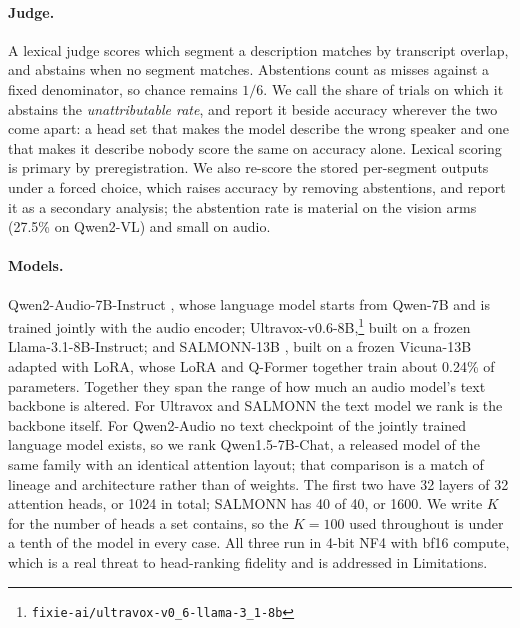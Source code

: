 \documentclass[11pt]{article}
\begin{document}
\paragraph{Judge.} A lexical judge scores which segment a description matches by
transcript overlap, and abstains when no segment matches. Abstentions count as
misses against a fixed denominator, so chance remains $1/6$. We call the share of
trials on which it abstains the \emph{unattributable rate}, and report it beside
accuracy wherever the two come apart: a head set that makes the model describe the
wrong speaker and one that makes it describe nobody score the same on accuracy
alone. Lexical scoring is
primary by preregistration. We also re-score the stored per-segment outputs under
a forced choice, which raises accuracy by removing abstentions, and report it as
a secondary analysis; the abstention rate is material on the vision arms (27.5\%
on Qwen2-VL) and small on audio.

\paragraph{Models.} Qwen2-Audio-7B-Instruct \citep{qwen2audio2024}, whose
language model starts from Qwen-7B and is trained jointly with the audio encoder;
Ultravox-v0.6-8B,\footnote{\texttt{fixie-ai/ultravox-v0\_6-llama-3\_1-8b}} built on
a frozen Llama-3.1-8B-Instruct; and SALMONN-13B \citep{salmonn2024}, built on a
frozen Vicuna-13B adapted with LoRA, whose LoRA and Q-Former together train about
0.24\% of parameters. Together they span the range
of how much an audio model's text backbone is altered. For Ultravox and SALMONN the
text model we rank is the backbone itself. For Qwen2-Audio no text checkpoint of
the jointly trained language model exists, so we rank Qwen1.5-7B-Chat, a released
model of the same family with an identical attention layout; that comparison is a
match of lineage and architecture rather than of weights. The first two have 32 layers of
32 attention heads, or 1024 in total; SALMONN has 40 of 40, or 1600. We write
$K$ for the number of heads a set contains, so the $K{=}100$ used throughout is
under a tenth of the model in every case. All three run in 4-bit NF4 with
bf16 compute, which is a real threat to head-ranking fidelity and is addressed in
Limitations.
\end{document}
